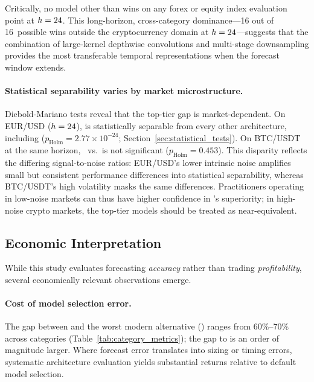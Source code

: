 Critically, no model other than \moderntcn wins on any forex or equity index evaluation point at $h=24$.  This long-horizon, cross-category dominance---16 out of 16~possible wins outside the cryptocurrency domain at $h=24$---suggests that the combination of large-kernel depthwise convolutions and multi-stage downsampling provides the most transferable temporal representations when the forecast window extends.

\paragraph{Statistical separability varies by market microstructure.}
Diebold-Mariano tests reveal that the top-tier gap is market-dependent.  On EUR/USD ($h=24$), \moderntcn is statistically separable from every other architecture, including \patchtst ($p_\text{Holm} = 2.77 \times 10^{-24}$; Section~\ref{sec:statistical_tests}).  On BTC/USDT at the same horizon, \moderntcn~vs.~\patchtst is not significant ($p_\text{Holm} = 0.453$).  This disparity reflects the differing signal-to-noise ratios: EUR/USD's lower intrinsic noise amplifies small but consistent performance differences into statistical separability, whereas BTC/USDT's high volatility masks the same differences.  Practitioners operating in low-noise markets can thus have higher confidence in \moderntcn's superiority; in high-noise crypto markets, the top-tier models should be treated as near-equivalent.

\subsection{Economic Interpretation}
\label{sec:economic_interpretation}

While this study evaluates forecasting \emph{accuracy} rather than trading \emph{profitability}, several economically relevant observations emerge.

\paragraph{Cost of model selection error.}
The \rmse gap between \moderntcn and the worst modern alternative (\autoformer) ranges from 60\%--70\% across categories (Table~\ref{tab:category_metrics}); the gap to \lstm is an order of magnitude larger.  Where forecast error translates into sizing or timing errors, systematic architecture evaluation yields substantial returns relative to default model selection.

